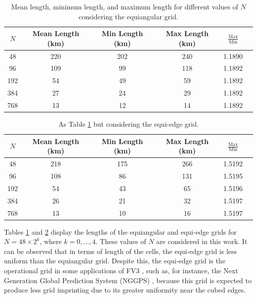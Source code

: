 \documentclass[preprint,12pt]{elsarticle}
\begin{document}
\begin{linenumbers}
\begin{table}[htbp]
	\caption{Mean length, minimum length, and maximum length for different values of $N$ considering the equiangular grid.\label{g2-dx-table}}
	\begin{tabular}{|c|c|c|c|c|c}\hline
		$N$ & Mean Length (km) & Min Length (km) & Max Length (km) & $\frac{\text{Max}}{\text{Min}}$ \\ \hline
		48 & 220 & 202 & 240 & 1.1890 \\
		96 & 109 & 99 & 118  & 1.1892 \\
		192 & 54 & 49 & 59  & 1.1892 \\
		384 & 27 & 24 & 29  & 1.1892 \\
		768 & 13 & 12 & 14  & 1.1892\\
		\hline
	\end{tabular} 
\end{table}
\begin{table}[htbp]
	\centering
	\caption{As Table \ref{g2-dx-table} but considering the equi-edge grid. \label{g0-dx-table}}
	\begin{tabular}{|c|c|c|c|c|c}\hline
		$N$ & Mean Length (km) & Min Length (km) & Max Length (km) & $\frac{\text{Max}}{\text{Min}}$ \\ \hline 
		48 & 218 & 175 & 266 & 1.5192 \\
		96 & 108 & 86 & 131 & 1.5195 \\
		192 & 54 & 43 & 65 & 1.5196 \\
		384 & 26 & 21 & 32 & 1.5197 \\
		768 & 13 & 10 & 16 & 1.5197 \\
		\hline
	\end{tabular}
\end{table}

Tables  \ref{g2-dx-table} and \ref{g0-dx-table} display the lengths of the  equiangular and equi-edge grids for $N=48\times 2^k$, 
where $k = 0,\ldots, 4$. These values of $N$ are considered in this work.
It can be observed that in terms of length of the cells, the equi-edge grid is less uniform than the equiangular grid.
Despite this, the equi-edge grid is the operational grid in some applications of FV3 \cite{harris:2021,chen:2021}, such as, for instance, 
the Next Generation Global Prediction System (NGGPS) \cite{zhou:2019}, 
because this grid is expected to produce less grid imprinting due to its greater uniformity near the cubed edges.


\end{linenumbers}
\end{document}
